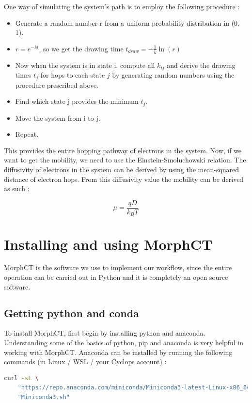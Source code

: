 \documentclass{article}
\begin{document}
One way of simulating the system's path is to employ the following procedure :

\begin{itemize}
    \item Generate a random number r from a uniform probability distribution in (0, 1).
    \item $r = e^{-kt}$, so we get the drawing time $t_{draw} = -\frac{1}{k} \ln(r)$
    \item Now when the system is in state i, compute all $k_{ij}$ and derive the drawing times $t_{j}$ for hops to each state $j$ by generating random numbers using the procedure prescribed above.
    \item Find which state j provides the minimum $t_j$.
    \item Move the system from i to j.
    \item Repeat.
\end{itemize}

This provides the entire hopping pathway of electrons in the system. Now, if we want to get the mobility, we need to use the Einstein-Smoluchowski relation. The diffusivity of electrons in the system can be derived by using the mean-squared distance of electron hops. From this diffusivity value the mobility can be derived as such :

$$\mu = \frac{q D}{k_B T}$$

\section{Installing and using MorphCT}


MorphCT is the software we use to implement our workflow, since the entire operation can be carried out in Python and it is completely an open source software. 

\subsection{Getting python and conda}

To install MorphCT, first begin by installing python and anaconda. Understanding some of the basics of python, pip and anaconda is very helpful in working with MorphCT. Anaconda can be installed by running the following commands (in Linux / WSL / your Cyclops account) :

\begin{lstlisting}[language=bash]
    curl -sL \
    "https://repo.anaconda.com/miniconda/Miniconda3-latest-Linux-x86_64.sh" \ >
    "Miniconda3.sh"
\end{lstlisting}
\end{document}
